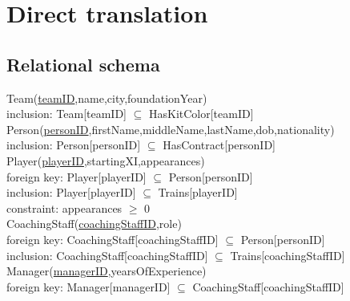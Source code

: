 \section{Direct translation}

\subsection{Relational schema}

\vspace{12px}

{\color{ForestGreen}Team(\underline{teamID},name,city,foundationYear)}\\
{\color{Orange}\hspace{2mm} inclusion: {\color{Magenta}Team[teamID] $\subseteq$ HasKitColor[teamID]}} \\

{\color{ForestGreen}Person(\underline{personID},firstName,middleName,lastName,dob,nationality)}\\
{\color{Orange}\hspace{2mm} inclusion: {\color{Magenta}Person[personID] $\subseteq$ HasContract[personID]}} \\

{\color{ForestGreen}Player(\underline{playerID},startingXI,appearances)}\\
{\color{Orange}\hspace{2mm} foreign key: {\color{Magenta}Player[playerID] $\subseteq$ Person[personID]}} \\
{\color{Orange}\hspace{2mm} inclusion: {\color{Magenta}Player[playerID] $\subseteq$ Trains[playerID]}} \\
{\color{Orange}\hspace{2mm} constraint: {\color{Magenta}appearances $\geqslant$  0 }} \\

{\color{ForestGreen}CoachingStaff(\underline{coachingStaffID},role)}\\
{\color{Orange}\hspace{2mm} foreign key: {\color{Magenta}CoachingStaff[coachingStaffID] $\subseteq$ Person[personID]}} \\
{\color{Orange}\hspace{2mm} inclusion: {\color{Magenta}CoachingStaff[coachingStaffID] $\subseteq$ Trains[coachingStaffID]}} \\

{\color{ForestGreen}Manager(\underline{managerID},yearsOfExperience)}\\
{\color{Orange}\hspace{2mm} foreign key: {\color{Magenta}Manager[managerID] $\subseteq$ CoachingStaff[coachingStaffID]}} \\

